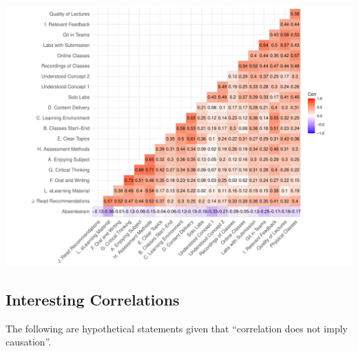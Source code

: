 \documentclass[
]{article}
\begin{document}
\includegraphics{AnalysisOfCourseEvaluation-Notebook_files/figure-latex/CorrelationMatrixWithFigures-1.pdf}

\subsection{Interesting Correlations}\label{interesting-correlations}

The following are hypothetical statements given that ``correlation does
not imply causation''.
\end{document}
